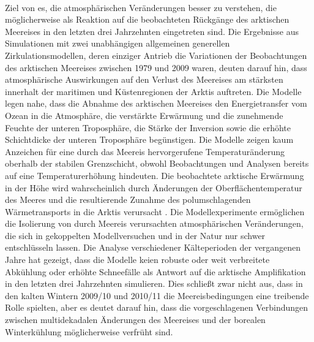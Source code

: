 \citet{screen-2013}\\
Ziel von \citet{screen-2013} es, die atmosphärischen Veränderungen besser zu verstehen, die möglicherweise als Reaktion auf die beobachteten Rückgänge des arktischen Meereises in den letzten drei Jahrzehnten eingetreten sind. Die Ergebnisse aus Simulationen mit zwei unabhängigen allgemeinen generellen Zirkulationsmodellen, deren einziger Antrieb die Variationen der Beobachtungen des arktischen Meereises zwischen 1979 und 2009 waren, deuten darauf hin, dass atmosphärische Auswirkungen auf den Verlust des Meereises am stärksten innerhalt der maritimen und Küstenregionen der Arktis auftreten. Die Modelle legen nahe, dass die Abnahme des arktischen Meereises den Energietransfer vom Ozean in die Atmosphäre, die verstärkte Erwärmung und die zunehmende Feuchte der unteren Troposphäre, die Stärke der Inversion sowie die erhöhte Schichtdicke der unteren Troposphäre begünstigen. Die Modelle zeigen kaum Anzeichen für eine durch das Meereis hervorgerufene Temperaturänderung oberhalb der stabilen Grenzschicht, obwohl Beobachtungen und Analysen bereits auf eine Temperaturerhöhung hindeuten. Die beobachtete arktische Erwärmung in der Höhe wird wahrscheinlich durch Änderungen der Oberflächentemperatur des Meeres und die resultierende Zunahme des polumschlagenden Wärmetransports in die Arktis verursacht \citet{screen-2012}. Die Modellexperimente ermöglichen die Isolierung von durch Meereis verursachten atmosphärischen Veränderungen, die sich in gekoppelten Modellversuchen und in der Natur nur schwer entschlüsseln lassen. Die Analyse verschiedener Kälteperioden der vergangenen Jahre hat gezeigt, dass die Modelle keien robuste oder weit verbreitete Abkühlung oder erhöhte Schneefälle als Antwort auf die arktische Amplifikation in den letzten drei Jahrzehnten simulieren. Dies schließt zwar nicht aus, dass in den kalten Wintern 2009/10 und 2010/11 die Meereisbedingungen eine treibende Rolle spielten, aber es deutet darauf hin, dass die vorgeschlagenen Verbindungen zwischen multidekadalen Änderungen des Meereises und der borealen Winterkühlung möglicherweise verfrüht sind. 

